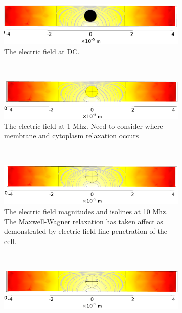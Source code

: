 \begin{figure}[h]
    \centering
    \begin{subfigure}[b]{\textwidth}
        \centering
        \includegraphics[width=\textwidth]{images/simple_cell_DC.png}
        \caption{The electric field at DC.}
    \end{subfigure}
    \\
    \vspace{0.1 in}
    \begin{subfigure}[b]{\textwidth}
        \centering
        \includegraphics[width=\textwidth]{images/simple_cell_1Mhz.png}
        \caption{The electric field at 1 Mhz. Need to consider where membrane and cytoplasm relaxation occurs}
    \end{subfigure}
    \\
    \vspace{0.1 in}
    \begin{subfigure}[b]{\textwidth}
        \centering
        \includegraphics[width=\textwidth]{images/simple_cell_10Mhz.png}
        \caption{The electric field magnitudes and isolines at 10 Mhz. The Maxwell-Wagner relaxation has taken affect as demonstrated by electric field line penetration of the cell.}
    \end{subfigure}
        \\
    \vspace{0.1 in}
    \begin{subfigure}[b]{\textwidth}
        \centering
        \includegraphics[width=\textwidth]{images/simple_cell_1Ghz.png}

\end{subfigure}
\end{figure}
